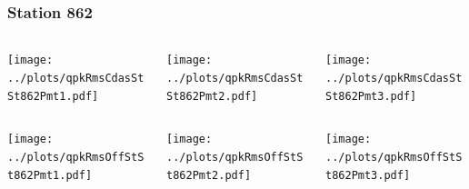 \documentclass[aspectratio=169]{beamer}
\begin{document}
\begin{frame} 
  \frametitle{Station 862}
  \begin{center}
    \begin{columns}
      \begin{column}{0.33\textwidth}
        \texttt{[image: ../plots/qpkRmsCdasStSt862Pmt1.pdf]}
      \end{column}
      \begin{column}{0.33\textwidth}
        \texttt{[image: ../plots/qpkRmsCdasStSt862Pmt2.pdf]}
      \end{column}
      \begin{column}{0.33\textwidth}
        \texttt{[image: ../plots/qpkRmsCdasStSt862Pmt3.pdf]}
      \end{column}
    \end{columns}
  \end{center}

  \begin{center}
    \begin{columns}
      \begin{column}{0.33\textwidth}
        \texttt{[image: ../plots/qpkRmsOffStSt862Pmt1.pdf]}
      \end{column}
      \begin{column}{0.33\textwidth}
        \texttt{[image: ../plots/qpkRmsOffStSt862Pmt2.pdf]}
      \end{column}
      \begin{column}{0.33\textwidth}
        \texttt{[image: ../plots/qpkRmsOffStSt862Pmt3.pdf]}
      \end{column}
    \end{columns}
  \end{center}
\end{frame}
\end{document}
